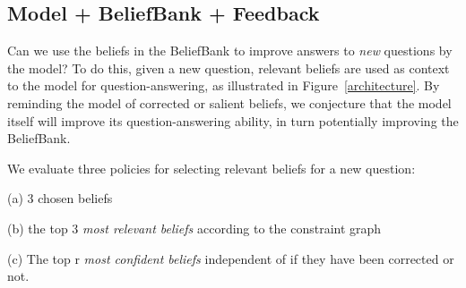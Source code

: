 \documentclass[11pt]{article}
\newcommand{\eat}[1]{}
\newenvironment{des}{                 %
     \parskip 0cm \begin{list}{}{\parsep 0cm \itemsep 0cm \topsep 0cm}}{
       \end{list}} %
\begin{document}

\subsection{Model + BeliefBank + Feedback}

Can we use the beliefs in the BeliefBank to improve answers to {\it new} questions by the model?
To do this, given a new question, relevant beliefs are used as 
context to the model for question-answering, as illustrated in Figure~\ref{architecture}. 
By reminding the model of corrected or salient beliefs, we conjecture that the model itself
will improve its question-answering ability, in turn potentially improving the
BeliefBank.

We evaluate three policies for selecting relevant beliefs for a new question:
\begin{des}
\item[(a)] 3 {\itrandomly chosen beliefs}
\item[(b)] the top 3 {\it most relevant beliefs} according to the constraint graph
\item[(c)] The top r {\it most confident beliefs} independent of if they have been corrected or not.
\end{des}

\eat{
Baselines:
\begin{des}
\item[(a)] 3 random beliefs of the model without SAT: works better than bm25 as it has more variety in what it adds whereas bm25 if no good match is found add always the same unhelpful context.
\item[(b)] The top 3 beliefs most similar to the question, as identified by BM25 (information retrieval) without SAT: see (a)
\item[(c)] 3 random beliefs of the belief bank after SAT.
\item[(d)] 3 most confident assertions according to the constraints: This works if the relevant queries have been already asked, if not it has the same problem as bm25 as it then adds always the same unfortunate context.
\end{des}}
\end{document}
